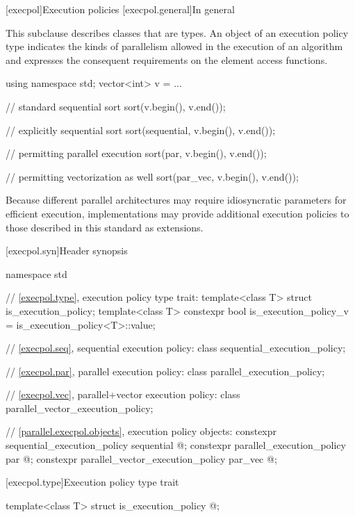 [execpol]{Execution policies}
[execpol.general]{In general}

\pnum
This subclause describes classes that are  types. An
object of an execution policy type indicates the kinds of parallelism allowed
in the execution of an algorithm and expresses the consequent requirements on
the element access functions.
\enterexample
\begin{codeblock}
using namespace std;
vector<int> v = ...

// standard sequential sort
sort(v.begin(), v.end());

// explicitly sequential sort
sort(sequential, v.begin(), v.end());

// permitting parallel execution
sort(par, v.begin(), v.end());

// permitting vectorization as well
sort(par_vec, v.begin(), v.end());
\end{codeblock}
\exitexample
\enternote
Because different parallel architectures may require idiosyncratic
parameters for efficient execution, implementations
may provide additional execution policies to those described in this
standard as extensions.
\exitnote

%
[execpol.syn]{Header  synopsis}
\begin{codeblock}
namespace std {
  // \ref{execpol.type}, execution policy type trait:
  template<class T> struct is_execution_policy;
  template<class T> constexpr bool is_execution_policy_v = is_execution_policy<T>::value;

  // \ref{execpol.seq}, sequential execution policy:
  class sequential_execution_policy;

  // \ref{execpol.par}, parallel execution policy:
  class parallel_execution_policy;

  // \ref{execpol.vec}, parallel+vector execution policy:
  class parallel_vector_execution_policy;

  // \ref{parallel.execpol.objects}, execution policy objects:
  constexpr sequential_execution_policy      sequential{ @\unspec@ };
  constexpr parallel_execution_policy        par{ @\unspec@ };
  constexpr parallel_vector_execution_policy par_vec{ @\unspec@ };
}
\end{codeblock}

[execpol.type]{Execution policy type trait}

%
\begin{itemdecl}
template<class T> struct is_execution_policy { @\seebelow@ };
\end{itemdecl}

